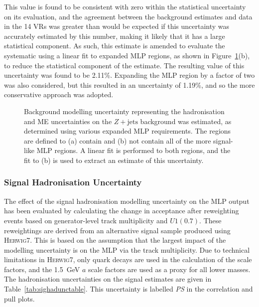 \documentclass[NOTE, atlasdraft=true, texlive=2017, UKenglish]{\ATLASLATEXPATH atlasdoc}
\begin{document}
This value is found to be consistent with zero within the statistical uncertainty on its evaluation, and the agreement between the background estimates and data in the 14 VRs was greater than would be expected if this uncertainty was accurately estimated by this number, making it likely that it has a large statistical component. As such, this estimate is amended to evaluate the systematic using a linear fit to expanded MLP regions, as shown in Figure~\ref{fig:bkgdmodelmgvssh}(b), to reduce the statistical component of the estimate. The resulting value of this uncertainty was found to be 2.11\%. Expanding the MLP region by a factor of two was also considered, but this resulted in an uncertainty of 1.19\%, and so the more conservative approach was adopted.

\begin{figure}[!htbp]
  \centering
  \caption{Background modelling uncertainty representing the hadronisation and ME uncertainties on the $Z+\text{jets}$ background was estimated, as determined using various expanded MLP requirements. The regions are defined to (a) contain and (b) not contain all of the more signal-like MLP regions. A linear fit is performed to both regions, and the fit to (b) is used to extract an estimate of this uncertainty.}
  \label{fig:bkgdmodelmgvssh}
\end{figure}


\subsubsection{Signal Hadronisation Uncertainty}
\label{sec:syssigdecaymodel}

The effect of the signal hadronisation modelling uncertainty on the MLP output has been evaluated by calculating the change in acceptance after reweighting events based on generator-level track multiplicity and $U1(0.7)$. These reweightings are derived from an alternative signal sample produced using \textsc{Herwig}7. This is based on the assumption that the largest impact of the modelling uncertainty is on the MLP via the track multiplicity. Due to technical limitations in \textsc{Herwig}7, only quark decays are used in the calculation of the scale factors, and the 1.5~GeV $a$ scale factors are used as a proxy for all lower masses. The hadronisation uncertainties on the signal estimates are given in Table~\ref{tab:sighadunctable}. This uncertainty is labelled \emph{PS} in the correlation and pull plots.
\end{document}
